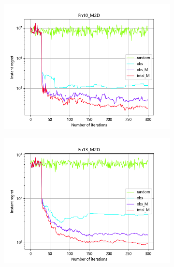 \documentclass{article}
\begin{document}
\begin{figure}[H]
\begin{subfigure}[t]{.32\linewidth}
        \includegraphics[width=1\textwidth]{pictures/Homo_noise_2D_onlyEI/Fn10_M2D_ins.png}
    \end{subfigure}
    \begin{subfigure}[t]{.32\linewidth}
        \centering
        \includegraphics[width=1\textwidth]{pictures/Homo_noise_2D_onlyEI/Fn13_M2D_ins.png}
    \end{subfigure}
    \begin{subfigure}[t]{.32\linewidth}
        \centering

\end{subfigure}
\end{figure}
\end{document}
